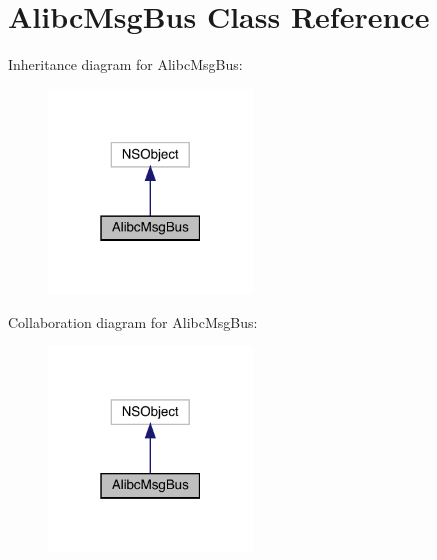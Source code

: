 \hypertarget{interface_alibc_msg_bus}{}\section{Alibc\+Msg\+Bus Class Reference}
\label{interface_alibc_msg_bus}


Inheritance diagram for Alibc\+Msg\+Bus\+:\nopagebreak
\begin{figure}[H]
\begin{center}
\leavevmode
\includegraphics[width=154pt]{interface_alibc_msg_bus__inherit__graph}
\end{center}
\end{figure}


Collaboration diagram for Alibc\+Msg\+Bus\+:\nopagebreak
\begin{figure}[H]
\begin{center}
\leavevmode
\includegraphics[width=154pt]{interface_alibc_msg_bus__coll__graph}
\end{center}
\end{figure}
